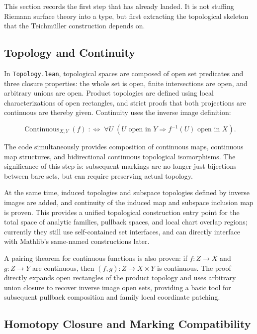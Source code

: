 \documentclass[UTF8,a4paper,11pt]{article}
\begin{document}
This section records the first step that has already landed. It is not stuffing Riemann surface theory into a type, but first extracting the topological skeleton that the Teichmüller construction depends on.

\subsection{Topology and Continuity}

In \texttt{Topology.lean}, topological spaces are composed of open set predicates and three closure properties: the whole set is open, finite intersections are open, and arbitrary unions are open. Product topologies are defined using local characterizations of open rectangles, and strict proofs that both projections are continuous are thereby given. Continuity uses the inverse image definition:

\[
\operatorname{Continuous}_{X,Y}(f)
\;:\Longleftrightarrow\;
\forall U\;(U\text{ open in }Y\Rightarrow f^{-1}(U)\text{ open in }X).
\]

The code simultaneously provides composition of continuous maps, continuous map structures, and bidirectional continuous topological isomorphisms. The significance of this step is: subsequent markings are no longer just bijections between bare sets, but can require preserving actual topology.

At the same time, induced topologies and subspace topologies defined by inverse images are added, and continuity of the induced map and subspace inclusion map is proven. This provides a unified topological construction entry point for the total space of analytic families, pullback spaces, and local chart overlap regions; currently they still use self-contained set interfaces, and can directly interface with Mathlib's same-named constructions later.

A pairing theorem for continuous functions is also proven: if $f:Z\to X$ and $g:Z\to Y$ are continuous, then $(f,g):Z\to X\times Y$ is continuous. The proof directly expands open rectangles of the product topology and uses arbitrary union closure to recover inverse image open sets, providing a basic tool for subsequent pullback composition and family local coordinate patching.

\subsection{Homotopy Closure and Marking Compatibility}
\end{document}
